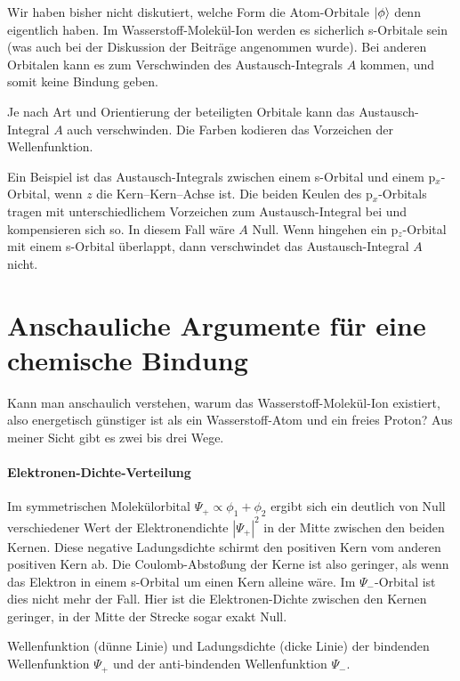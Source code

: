Wir haben bisher nicht diskutiert, welche Form die Atom-Orbitale $\ket{\phi}$ denn eigentlich haben.
Im Wasserstoff-Molekül-Ion   werden es sicherlich s-Orbitale sein (was auch bei der Diskussion der Beiträge angenommen wurde). Bei anderen Orbitalen kann es zum Verschwinden des Austausch-Integrals $A$ kommen, und somit keine Bindung geben.

\begin{marginfigure}

\caption{Je nach Art und Orientierung der beteiligten Orbitale kann das Austausch-Integral $A$ auch verschwinden. Die Farben kodieren das Vorzeichen der Wellenfunktion. }
\end{marginfigure}



Ein Beispiel ist das Austausch-Integrals zwischen  einem s-Orbital und einem p$_x$-Orbital, wenn $z$ die Kern--Kern--Achse ist.  Die beiden Keulen des  p$_x$-Orbitals tragen mit unterschiedlichem Vorzeichen zum Austausch-Integral bei und kompensieren sich so. In diesem Fall wäre $A$ Null. Wenn hingehen ein p$_z$-Orbital mit einem s-Orbital überlappt, dann verschwindet das  Austausch-Integral $A$ nicht.


\section{Anschauliche Argumente für eine chemische Bindung}

Kann man anschaulich verstehen, warum das Wasserstoff-Molekül-Ion existiert, also energetisch günstiger ist als ein Wasserstoff-Atom und ein freies Proton? Aus meiner Sicht gibt es zwei bis drei Wege.

\paragraph{Elektronen-Dichte-Verteilung} Im symmetrischen Molekülorbital $\Psi_+ \propto \phi_1 + \phi_2$ ergibt sich ein deutlich von Null verschiedener Wert der Elektronendichte $|\Psi_+|^2$ in der Mitte zwischen den beiden Kernen. Diese negative Ladungsdichte schirmt den positiven Kern vom anderen positiven Kern ab. Die Coulomb-Abstoßung der Kerne ist also geringer, als wenn das Elektron in einem s-Orbital um einen Kern alleine  wäre. Im $\Psi_-$-Orbital ist dies nicht mehr der Fall. Hier ist die Elektronen-Dichte zwischen den Kernen geringer, in der Mitte der Strecke sogar exakt Null.
%
\begin{marginfigure}[-50mm]
\caption{ Wellenfunktion (dünne Linie) und Ladungsdichte (dicke Linie) der bindenden Wellenfunktion $\Psi_+$ und der  anti-bindenden Wellenfunktion $\Psi_-$.}
\end{marginfigure}



